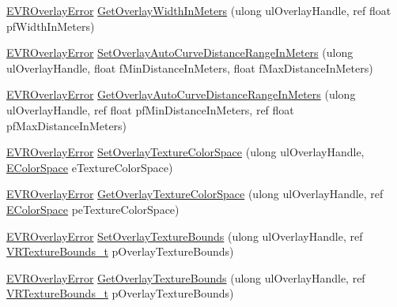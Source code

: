 \begin{DoxyCompactItemize}
\mbox{\hyperlink{namespace_valve_1_1_v_r_aaee5c5144f42b7969d45b854f51b0c18}{E\+V\+R\+Overlay\+Error}} \mbox{\hyperlink{class_valve_1_1_v_r_1_1_c_v_r_overlay_a0a9ae53f6db2d67c61f4b64a835690db}{Get\+Overlay\+Width\+In\+Meters}} (ulong ul\+Overlay\+Handle, ref float pf\+Width\+In\+Meters)
\item 
\mbox{\hyperlink{namespace_valve_1_1_v_r_aaee5c5144f42b7969d45b854f51b0c18}{E\+V\+R\+Overlay\+Error}} \mbox{\hyperlink{class_valve_1_1_v_r_1_1_c_v_r_overlay_af14a68350c5c9c43e3363a0d40456a36}{Set\+Overlay\+Auto\+Curve\+Distance\+Range\+In\+Meters}} (ulong ul\+Overlay\+Handle, float f\+Min\+Distance\+In\+Meters, float f\+Max\+Distance\+In\+Meters)
\item 
\mbox{\hyperlink{namespace_valve_1_1_v_r_aaee5c5144f42b7969d45b854f51b0c18}{E\+V\+R\+Overlay\+Error}} \mbox{\hyperlink{class_valve_1_1_v_r_1_1_c_v_r_overlay_aaef888c61e319cf3be2bf0f8ddce969d}{Get\+Overlay\+Auto\+Curve\+Distance\+Range\+In\+Meters}} (ulong ul\+Overlay\+Handle, ref float pf\+Min\+Distance\+In\+Meters, ref float pf\+Max\+Distance\+In\+Meters)
\item 
\mbox{\hyperlink{namespace_valve_1_1_v_r_aaee5c5144f42b7969d45b854f51b0c18}{E\+V\+R\+Overlay\+Error}} \mbox{\hyperlink{class_valve_1_1_v_r_1_1_c_v_r_overlay_a3cbb113af32f788ca793a39edee39477}{Set\+Overlay\+Texture\+Color\+Space}} (ulong ul\+Overlay\+Handle, \mbox{\hyperlink{namespace_valve_1_1_v_r_aeb0fba37ba28d8ca276d7c10f01809ac}{E\+Color\+Space}} e\+Texture\+Color\+Space)
\item 
\mbox{\hyperlink{namespace_valve_1_1_v_r_aaee5c5144f42b7969d45b854f51b0c18}{E\+V\+R\+Overlay\+Error}} \mbox{\hyperlink{class_valve_1_1_v_r_1_1_c_v_r_overlay_a4d83986df1c1bc6596e827f20d3d3c41}{Get\+Overlay\+Texture\+Color\+Space}} (ulong ul\+Overlay\+Handle, ref \mbox{\hyperlink{namespace_valve_1_1_v_r_aeb0fba37ba28d8ca276d7c10f01809ac}{E\+Color\+Space}} pe\+Texture\+Color\+Space)
\item 
\mbox{\hyperlink{namespace_valve_1_1_v_r_aaee5c5144f42b7969d45b854f51b0c18}{E\+V\+R\+Overlay\+Error}} \mbox{\hyperlink{class_valve_1_1_v_r_1_1_c_v_r_overlay_a8db6be23797cb69a764fac38be6bb046}{Set\+Overlay\+Texture\+Bounds}} (ulong ul\+Overlay\+Handle, ref \mbox{\hyperlink{struct_valve_1_1_v_r_1_1_v_r_texture_bounds__t}{V\+R\+Texture\+Bounds\+\_\+t}} p\+Overlay\+Texture\+Bounds)
\item 
\mbox{\hyperlink{namespace_valve_1_1_v_r_aaee5c5144f42b7969d45b854f51b0c18}{E\+V\+R\+Overlay\+Error}} \mbox{\hyperlink{class_valve_1_1_v_r_1_1_c_v_r_overlay_ab347e37cf63cc5481f6a629212126e5d}{Get\+Overlay\+Texture\+Bounds}} (ulong ul\+Overlay\+Handle, ref \mbox{\hyperlink{struct_valve_1_1_v_r_1_1_v_r_texture_bounds__t}{V\+R\+Texture\+Bounds\+\_\+t}} p\+Overlay\+Texture\+Bounds)

\end{DoxyCompactItemize}

